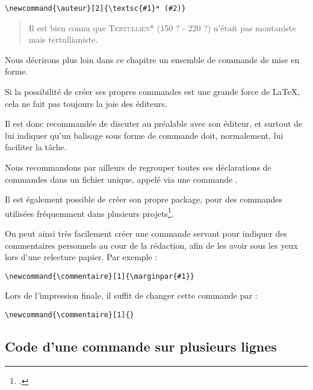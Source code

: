 \begin{verbatim}
\newcommand{\auteur}[2]{\textsc{#1}* (#2)}
\end{verbatim}

\renewcommand{\auteur}[2]{\textsc{#1}* (#2)}

\begin{quotation}
Il est bien connu que \auteur{Tertullien}{150 ? - 220 ?}
n'était pas montaniste mais tertullianiste.
\end{quotation}

Nous décrirons plus loin dans ce chapitre un ensemble de commande de mise en forme.

\begin{attention}
	Si la possibilité de créer ses propres commandes est une grande force de \LaTeX, cela ne fait pas toujours la joie des éditeurs. 
	
	Il est donc recommandée de discuter au préalable avec son éditeur, et surtout de lui indiquer qu'un balisage sous forme de commande doit, normalement, lui faciliter la tâche.
	
	
	Nous recommandons par ailleurs de regrouper toutes ses déclarations de commandes dans un fichier unique, appelé via une commande .
	
	Il est également possible de créer son propre package, pour des commandes utilisées fréquemment dans plusieurs projets\footcite[Ceci dépasserais le cadre de cet ouvrage : je renvois à d'autres documents. Par exemples][]{creer_sty}.
\end{attention}


\begin{plusloins}\label{commentaireredac}
On peut ainsi très facilement créer une commande  servant pour indiquer des commentaires personnels au cour de la rédaction, afin de les avoir sous les yeux lors d'une relecture papier.
Par exemple :

\begin{verbatim}
\newcommand{\commentaire}[1]{\marginpar{#1}}
\end{verbatim}

Lors de l'impression finale, il suffit de changer cette commande par :

\begin{verbatim}
\newcommand{\commentaire}[1]{}
\end{verbatim}

\end{plusloins}

\subsection{Code d'une commande sur plusieurs lignes}\label{commandepourcent}

